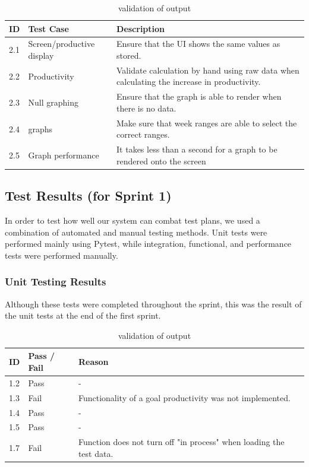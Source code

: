 \documentclass[12pt,a4paper]{article}
\begin{document}
\begin{table}[H]
    \centering
    \renewcommand{\arraystretch}{1.3}
    \begin{tabular}{|l|l|p{9cm}|}
        \hline
        \textbf{ID} & \textbf{Test Case} & \textbf{Description} \\
        \hline
        2.1 & Screen/productive display & Ensure that the UI shows the same values as stored.\\
        \hline
        2.2 & Productivity & Validate calculation by hand using raw data when calculating the increase in productivity.\\
        \hline
        2.3 & Null graphing & Ensure that the graph is able to render when there is no data.\\
        \hline
        2.4 & graphs & Make sure that week ranges are able to select the correct ranges.\\
        \hline
        2.5 & Graph performance & It takes less than a second for a graph to be rendered onto the screen\\
        \hline
    \end{tabular}
    \caption{validation of output}
    \label{tab:output_tests}
\end{table}

\subsection{Test Results (for Sprint 1)}
\FloatBarrier

In order to test how well our system can combat test plans, we used a combination of automated and manual testing methods. Unit tests were performed mainly using Pytest, while integration, functional, and performance tests were performed manually.

\subsubsection{Unit Testing Results}
Although these tests were completed throughout the sprint, this was the result of the unit tests at the end of the first sprint.
\begin{table}[H]
    \centering
    \renewcommand{\arraystretch}{1.3}
    \begin{tabular}{|l|l|p{9cm}|}
        \hline
        \textbf{ID} & \textbf{Pass / Fail} & \textbf{Reason}\\
        \hline
        1.2 & Pass & -\\
        \hline
        1.3 & Fail & Functionality of a goal productivity was not implemented.\\
        \hline
        1.4 & Pass & -\\
        \hline
        1.5 & Pass & -\\
        \hline
        1.7 & Fail & Function does not turn off "in process" when loading the test data.\\
        \hline
    \end{tabular}
    \caption{validation of output}
    \label{tab:output_tests}
\end{table}
\end{document}
